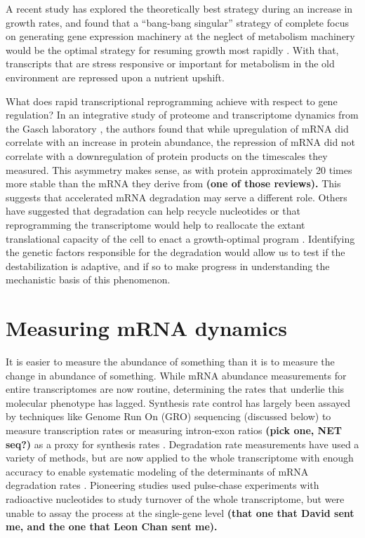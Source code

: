 {A recent study has
explored the theoretically best strategy during an increase in growth
rates, and found that a “bang-bang singular” strategy of complete
focus on generating gene expression machinery at the neglect of
metabolism machinery would be the optimal strategy for resuming growth
most rapidly 
\parencite{giordano2016dynamical}. With that, transcripts that are
stress responsive or important for metabolism in the old environment
are repressed upon a nutrient upshift.  


What does rapid transcriptional reprogramming achieve with respect to gene regulation?
In an integrative study of proteome and transcriptome dynamics from
the Gasch laboratory 
\parencite{lee2011dynamic}, the authors found that while
upregulation of mRNA did correlate with an increase in protein
abundance, the repression of mRNA did not correlate with a
downregulation of protein products on the timescales they measured.
This asymmetry makes sense, as with protein approximately 20 times
more stable than the mRNA they derive from 
\textbf{(one of those reviews).}
This suggests that accelerated mRNA degradation may serve a different
role. Others have suggested that degradation can help recycle
nucleotides 
\parencite{kresnowati2006transcriptome}
or that reprogramming the
transcriptome would help to reallocate the extant translational
capacity of the cell to enact a growth-optimal program 
\parencite{kief1981coordinate,giordano2016dynamical,shachrai2010cost}. 
Identifying
the genetic factors responsible for the degradation would allow us to
test if the destabilization is adaptive, and if so to make progress in
understanding the mechanistic basis of this phenomenon.

\section{Measuring mRNA dynamics}

It is easier to measure the abundance of something than
it is to measure the change in abundance of something. While mRNA
abundance measurements for entire transcriptomes are now routine,
determining the rates that underlie this molecular phenotype has
lagged. Synthesis rate control has largely been assayed by techniques
like Genome Run On (GRO) sequencing (discussed below) to measure
transcription rates or measuring intron-exon ratios 
\textbf{(pick one, NET seq?)}
as a proxy for synthesis rates 
\parencite{perez2013eukaryotic}.
Degradation rate measurements have used a variety of methods, but are
now applied to the whole transcriptome with enough accuracy to enable
systematic modeling of the determinants of mRNA degradation rates
\parencite{perez2013eukaryotic,neymotin2016multiple,cheng2017cis}.
Pioneering studies used pulse-chase experiments with radioactive
nucleotides to study turnover of the whole transcriptome, but were
unable to assay the process at the single-gene level 
\textbf{(that one that
David sent me, and the one that Leon Chan sent me).}

}
